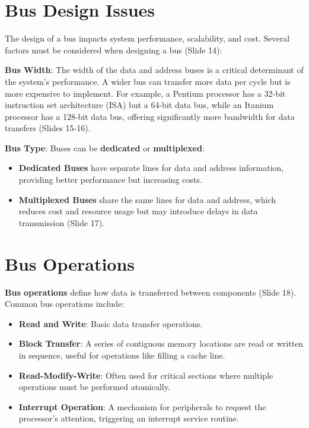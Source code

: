 \documentclass[
  14pt,
  a4paper,
  numbers=noendperiod,
  headinclude=true,
  footinclude=true,
  DIV=calc]{scrreprt}
\begin{document}
\section{Bus Design Issues}\label{bus-design-issues}

The design of a bus impacts system performance, scalability, and cost.
Several factors must be considered when designing a bus (Slide 14):

\textbf{Bus Width}: The width of the data and address buses is a
critical determinant of the system's performance. A wider bus can
transfer more data per cycle but is more expensive to implement. For
example, a Pentium processor has a 32-bit instruction set architecture
(ISA) but a 64-bit data bus, while an Itanium processor has a 128-bit
data bus, offering significantly more bandwidth for data transfers
(Slides 15-16).

\textbf{Bus Type}: Buses can be \textbf{dedicated} or
\textbf{multiplexed}:

\begin{itemize}
\item
  \textbf{Dedicated Buses} have separate lines for data and address
  information, providing better performance but increasing costs.
\item
  \textbf{Multiplexed Buses} share the same lines for data and address,
  which reduces cost and resource usage but may introduce delays in data
  transmission (Slide 17).
\end{itemize}

\section{Bus Operations}\label{bus-operations}

\textbf{Bus operations} define how data is transferred between
components (Slide 18). Common bus operations include:

\begin{itemize}
\item
  \textbf{Read and Write}: Basic data transfer operations.
\item
  \textbf{Block Transfer}: A series of contiguous memory locations are
  read or written in sequence, useful for operations like filling a
  cache line.
\item
  \textbf{Read-Modify-Write}: Often used for critical sections where
  multiple operations must be performed atomically.
\item
  \textbf{Interrupt Operation}: A mechanism for peripherals to request
  the processor's attention, triggering an interrupt service routine.
\end{itemize}
\end{document}
